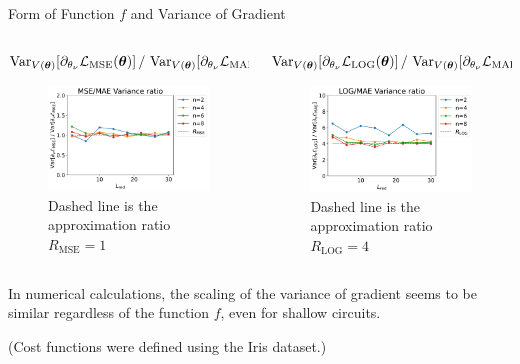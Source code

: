 \documentclass[dvipdfmx,10pt,aspectratio=169]{beamer}
\begin{document}
\begin{frame}{Form of Function $f$ and Variance of Gradient}
    \begin{columns}
        \begin{column}{0.5\textwidth}
            \begin{small}
                \centering\hspace*{-10pt} $\operatorname{Var}_{V(\vb*{\theta})}[\partial_{\theta_\nu}\mathcal{L}_{\mathrm{MSE}}(\vb*{\theta})]\,/\,\operatorname{Var}_{V(\vb*{\theta})}[\partial_{\theta_\nu}\mathcal{L}_{\mathrm{MAE}}(\vb*{\theta})]$
            \end{small}
            \begin{figure}
                \centering\includegraphics[width=7cm]{variance-mse-mae-ratio_encoding3.pdf}
                \caption{Dashed line is the approximation ratio $R_{\mathrm{MSE}}=1$}
            \end{figure}
        \end{column}
        \begin{column}{0.5\textwidth}
            \begin{small}
                \centering\hspace*{-10pt} $\operatorname{Var}_{V(\vb*{\theta})}[\partial_{\theta_\nu}\mathcal{L}_{\mathrm{LOG}}(\vb*{\theta})]\,/\,\operatorname{Var}_{V(\vb*{\theta})}[\partial_{\theta_\nu}\mathcal{L}_{\mathrm{MAE}}(\vb*{\theta})]$
            \end{small}
            \begin{figure}
                \centering\includegraphics[width=7cm]{variance-log-mae-ratio_encoding3.pdf}
                \caption{Dashed line is the approximation ratio $R_{\mathrm{LOG}}=4$}
            \end{figure}
        \end{column}
    \end{columns}
    \centering
    \hspace{-10pt}In numerical calculations, the scaling of the variance of gradient seems to be similar regardless of the function $f$, even for shallow circuits.\\
    
    \begin{scriptsize}
        (Cost functions were defined using the Iris dataset.)
    \end{scriptsize}
\end{frame}
\end{document}
